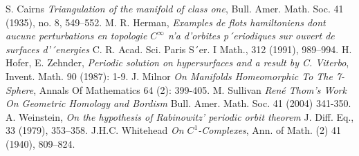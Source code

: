 \documentclass[12pt]{article}
\theoremstyle{definition}
\numberwithin{equation}{section}
\begin{document}
\begin{thebibliography}{100}
 S. Cairns \emph{Triangulation of the manifold of class one}, Bull. Amer. Math. Soc. 41 (1935),
no. 8, 549–552.
 M. R. Herman, \emph{Examples de flots hamiltoniens dont aucune perturbations en
topologie $C^\infty$ n’a d’orbites p´eriodiques sur ouvert de surfaces d’´energies} C. R.
Acad. Sci. Paris S´er. I Math., 312 (1991), 989–994.
 H. Hofer, E. Zehnder, \emph{Periodic solution on hypersurfaces and a result by C.
Viterbo}, Invent. Math. 90 (1987): 1-9.
 J. Milnor \emph{On Manifolds Homeomorphic To The 7-Sphere}, Annals Of Mathematics 64 (2): 399-405.
 M. Sullivan \emph{Ren\'{e} Thom's Work On Geometric Homology and Bordism} Bull. Amer. Math. Soc. 41 (2004) 341-350.
 A. Weinstein, \emph{On the hypothesis of Rabinowitz’ periodic orbit theorem} J. Diff. Eq., 33 (1979), 353–358.
 J.H.C. Whitehead \emph{On $C^1$-Complexes}, Ann. of Math. (2) 41 (1940), 809–824.

\end{thebibliography}
\end{document}
